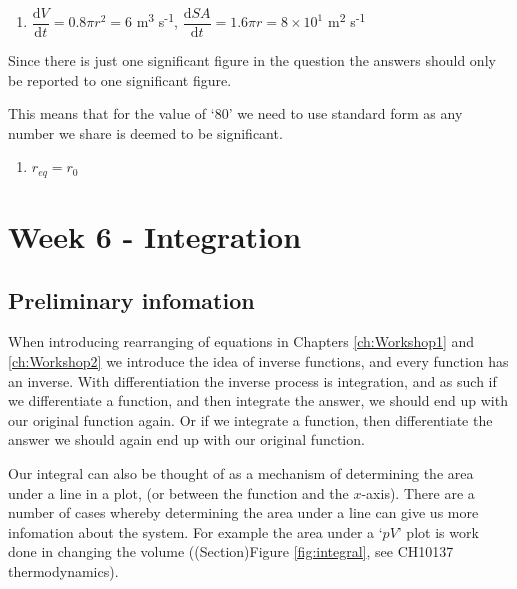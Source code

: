 \documentclass[
]{book}
\providecommand{\tightlist}{%
  \setlength{\itemsep}{0pt}\setlength{\parskip}{0pt}}
\begin{document}
\begin{enumerate}
\def\labelenumi{\arabic{enumi}.}
\tightlist
\item
  \(\dfrac{\textrm{d}V}{\textrm{d}t}= 0.8 \pi r^2= 6\) m\textsuperscript{3} s\textsuperscript{-1}, \(\dfrac{\textrm{d}SA}{\textrm{d}t}=1.6 \pi r = 8 \times 10^1\) m\textsuperscript{2} s\textsuperscript{-1}
\end{enumerate}

Since there is just one significant figure in the question the answers should only be reported to one significant figure.

This means that for the value of `80' we need to use standard form as any number we share is deemed to be significant.

\begin{enumerate}
\def\labelenumi{\arabic{enumi}.}
\tightlist
\item
  \(r_{eq}=r_0\)
\end{enumerate}

\hypertarget{ch:Workshop6}{%
\chapter{Week 6 - Integration}\label{ch:Workshop6}}

\hypertarget{sec:Prelim6}{%
\section{Preliminary infomation}\label{sec:Prelim6}}

When introducing rearranging of equations in Chapters \ref{ch:Workshop1} and \ref{ch:Workshop2} we introduce the idea of inverse functions, and every function has an inverse. With differentiation the inverse process is integration, and as such if we differentiate a function, and then integrate the answer, we should end up with our original function again. Or if we integrate a function, then differentiate the answer we should again end up with our original function.

Our integral can also be thought of as a mechanism of determining the area under a line in a plot, (or between the function and the \(x\)-axis). There are a number of cases whereby determining the area under a line can give us more infomation about the system. For example the area under a `\(pV\)' plot is work done in changing the volume ((Section)Figure \ref{fig:integral}, see CH10137 thermodynamics).
\end{document}
